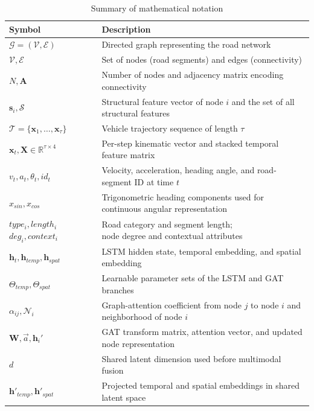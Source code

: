 \documentclass[journal]{IEEEtran}
\begin{document}
\begin{table}[!htbp]
  \centering
  \caption{Summary of mathematical notation}
  \label{tab:notations}
  \renewcommand{\arraystretch}{1.2}
  \begin{tabular}{@{}p{}p{}@{}}
    \toprule
    \textbf{Symbol} & \textbf{Description} \\ \midrule
    $\mathcal{G} = (\mathcal{V}, \mathcal{E})$ & Directed graph representing the road network \\
    $\mathcal{V}, \mathcal{E}$ & Set of nodes (road segments) and edges (connectivity) \\
    $N, \mathbf{A}$ & Number of nodes and adjacency matrix encoding connectivity \\
    $\mathbf{s}_i, \mathcal{S}$ & Structural feature vector of node $i$ and the set of all structural features \\
    $\mathcal{T} = \{\mathbf{x}_1, \dots, \mathbf{x}_\tau\}$ & Vehicle trajectory sequence of length $\tau$ \\
    $\mathbf{x}_t, \mathbf{X} \in \mathbb{R}^{\tau \times 4}$ & Per-step kinematic vector and stacked temporal feature matrix \\
    $v_t, a_t, \theta_t, id_t$ & Velocity, acceleration, heading angle, and road-segment ID at time $t$ \\
    $x_{sin}, x_{cos}$ & Trigonometric heading components used for continuous angular representation \\
    \shortstack[l]{$type_i, length_i$\\$deg_i, context_i$} & \shortstack[l]{Road category and segment length;\\node degree and contextual attributes} \\
    $\mathbf{h}_t, \mathbf{h}_{temp}, \mathbf{h}_{spat}$ & LSTM hidden state, temporal embedding, and spatial embedding \\
    $\Theta_{temp}, \Theta_{spat}$ & Learnable parameter sets of the LSTM and GAT branches \\
    $\alpha_{ij}, \mathcal{N}_i$ & Graph-attention coefficient from node $j$ to node $i$ and neighborhood of node $i$ \\
    $\mathbf{W}, \vec{a}, \mathbf{h}_i'$ & GAT transform matrix, attention vector, and updated node representation \\
    $d$ & Shared latent dimension used before multimodal fusion \\
    $\mathbf{h}'_{temp}, \mathbf{h}'_{spat}$ & Projected temporal and spatial embeddings in shared latent space \\

\end{tabular}
\end{table}
\end{document}
